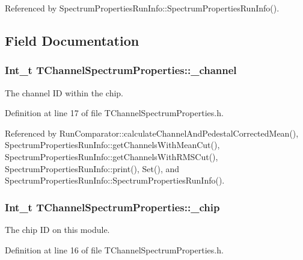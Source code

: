 Referenced by Spectrum\-Properties\-Run\-Info\-::\-Spectrum\-Properties\-Run\-Info().



\subsection{Field Documentation}
\hypertarget{class_t_channel_spectrum_properties_a6bfd5e0b63e55aed4d1816a722f5c2e7}{
\subsubsection[{\-\_\-channel}]{\setlength{\rightskip}{0pt plus 5cm}Int\-\_\-t T\-Channel\-Spectrum\-Properties\-::\-\_\-channel}}\label{class_t_channel_spectrum_properties_a6bfd5e0b63e55aed4d1816a722f5c2e7}


The channel I\-D within the chip. 



Definition at line 17 of file T\-Channel\-Spectrum\-Properties.\-h.



Referenced by Run\-Comparator\-::calculate\-Channel\-And\-Pedestal\-Corrected\-Mean(), Spectrum\-Properties\-Run\-Info\-::get\-Channels\-With\-Mean\-Cut(), Spectrum\-Properties\-Run\-Info\-::get\-Channels\-With\-R\-M\-S\-Cut(), Spectrum\-Properties\-Run\-Info\-::print(), Set(), and Spectrum\-Properties\-Run\-Info\-::\-Spectrum\-Properties\-Run\-Info().

\hypertarget{class_t_channel_spectrum_properties_afdfd4c52a9b23cd7cd76dda75b595e27}{
\subsubsection[{\-\_\-chip}]{\setlength{\rightskip}{0pt plus 5cm}Int\-\_\-t T\-Channel\-Spectrum\-Properties\-::\-\_\-chip}}\label{class_t_channel_spectrum_properties_afdfd4c52a9b23cd7cd76dda75b595e27}


The chip I\-D on this module. 



Definition at line 16 of file T\-Channel\-Spectrum\-Properties.\-h.



